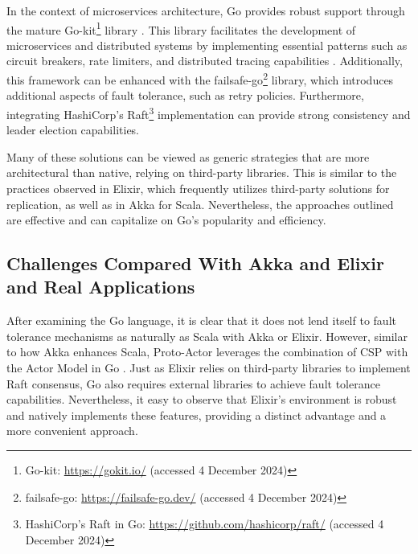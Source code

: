 
In the context of microservices architecture, Go provides robust support through the mature Go-kit\footnote{Go-kit: \url{https://gokit.io/} (accessed 4 December 2024)} library \cite{go-kit-docs}. This library facilitates the development of microservices and distributed systems by implementing essential patterns such as circuit breakers, rate limiters, and distributed tracing capabilities \cite{go-kit-docs, Shuiskov2022}. Additionally, this framework can be enhanced with the failsafe-go\footnote{failsafe-go: \url{https://failsafe-go.dev/} (accessed 4 December 2024)} library, which introduces additional aspects of fault tolerance, such as retry policies. Furthermore, integrating HashiCorp's Raft\footnote{HashiCorp's Raft in Go: \url{https://github.com/hashicorp/raft/} (accessed 4 December 2024)} implementation can provide strong consistency and leader election capabilities.

Many of these solutions can be viewed as generic strategies that are more architectural than native, relying on third-party libraries. This is similar to the practices observed in Elixir, which frequently utilizes third-party solutions for replication, as well as in Akka for Scala. Nevertheless, the approaches outlined are effective and can capitalize on Go's popularity and efficiency.

\subsection{Challenges Compared With Akka and Elixir and Real Applications}

After examining the Go language, it is clear that it does not lend itself to fault tolerance mechanisms as naturally as Scala with Akka or Elixir. However, similar to how Akka enhances Scala, Proto-Actor leverages the combination of CSP with the Actor Model in Go \cite{proto-actor-docs}. Just as Elixir relies on third-party libraries to implement Raft consensus, Go also requires external libraries to achieve fault tolerance capabilities. Nevertheless, it easy to observe that Elixir's environment is robust and natively implements these features, providing a distinct advantage and a more convenient approach.

